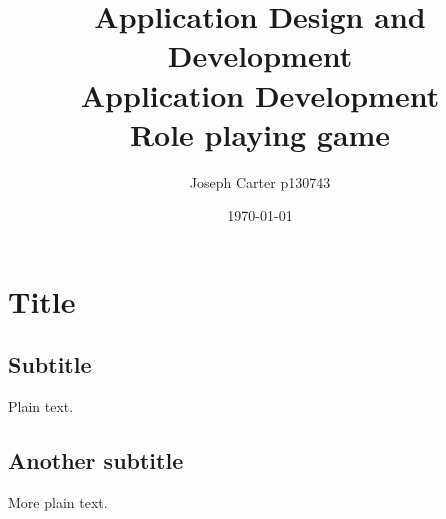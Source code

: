 \documentclass{template}
\author{Joseph Carter p130743}
\title{\textbf{Application Design and Development\\Application Development}\\ Role playing game}
\date{\today}
\begin{document}
\maketitle

\tableofcontents

\section{Title}

\subsection{Subtitle}


Plain text.

\subsection{Another subtitle}

More plain text.
\end{document}
